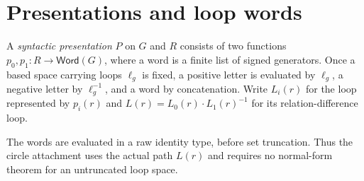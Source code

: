 \section{Presentations and loop words}

\begin{definition}
A \emph{syntactic presentation} $P$ on $G$ and $R$ consists of two functions
$p_0,p_1:R\to\mathsf{Word}(G)$, where a word is a finite list of signed
generators.  Once a based space carrying loops $\ell_g$ is fixed, a positive
letter is evaluated by $\ell_g$, a negative letter by $\ell_g^{-1}$, and a
word by concatenation.  Write $L_i(r)$ for the loop represented by $p_i(r)$
and $L(r)=L_0(r)\cdot L_1(r)^{-1}$ for its relation-difference loop.
\end{definition}

The words are evaluated in a raw identity type, before set truncation.  Thus
the circle attachment uses the actual path $L(r)$ and requires no normal-form
theorem for an untruncated loop space.
